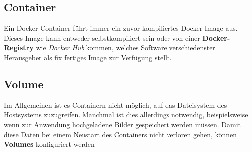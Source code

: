 \subsection{Container}

Ein Docker-Container führt immer ein zuvor kompiliertes Docker-Image aus. Dieses Image kann entweder selbstkompiliert sein oder von einer \textbf{Docker-Registry} wie \textit{Docker Hub} kommen, welches Software verschiedenster Herausgeber als fix fertiges Image zur Verfügung stellt.

\subsection{Volume}

Im Allgemeinen ist es Containern nicht möglich, auf das Dateisystem des Hostsystems zuzugreifen. Manchmal ist dies allerdings notwendig, beispielsweise wenn zur Anwendung hochgeladene Bilder gespeichert werden müssen. Damit diese Daten bei einem Neustart des Containers nicht verloren gehen, können \textbf{Volumes} konfiguriert werden